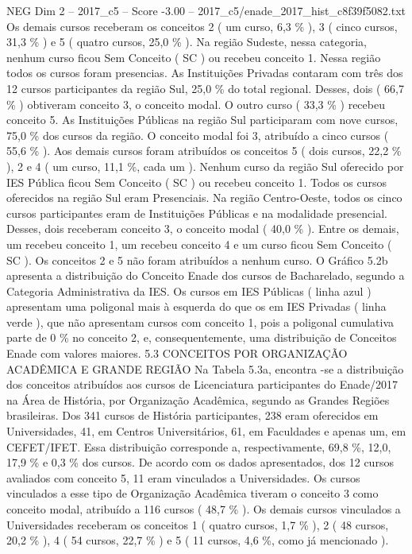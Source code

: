 \begin{textsample}{NEG Dim 2 – 2017\_c5 – Score -3.00 – 2017\_c5/enade\_2017\_hist\_c8f39f5082.txt}
Os demais cursos receberam os conceitos 2 ( um curso, 6,3 \% ), 3 ( cinco cursos, 31,3 \% ) e 5 ( quatro cursos, 25,0 \% ).
Na região Sudeste, nessa categoria, nenhum curso ficou Sem Conceito ( SC ) ou recebeu conceito 1.
Nessa região todos os cursos foram presencias.
As Instituições Privadas contaram com três dos 12 cursos participantes da região Sul, 25,0 \% do total regional.
Desses, dois ( 66,7 \% ) obtiveram conceito 3, o conceito modal.
O outro curso ( 33,3 \% ) recebeu conceito 5.
As Instituições Públicas na região Sul participaram com nove cursos, 75,0 \% dos cursos da região.
O conceito modal foi 3, atribuído a cinco cursos ( 55,6 \% ).
Aos demais cursos foram atribuídos os conceitos 5 ( dois cursos, 22,2 \% ), 2 e 4 ( um curso, 11,1 \%, cada um ).
Nenhum curso da região Sul oferecido por IES Pública ficou Sem Conceito ( SC ) ou recebeu conceito 1.
Todos os cursos oferecidos na região Sul eram Presenciais.
Na região Centro-Oeste, todos os cinco cursos participantes eram de Instituições Públicas e na modalidade presencial.
Desses, dois receberam conceito 3, o conceito modal ( 40,0 \% ).
Entre os demais, um recebeu conceito 1, um recebeu conceito 4 e um curso ficou Sem Conceito ( SC ).
Os conceitos 2 e 5 não foram atribuídos a nenhum curso.
O Gráfico 5.2b apresenta a distribuição do Conceito Enade dos cursos de Bacharelado, segundo a Categoria Administrativa da IES.
Os cursos em IES Públicas ( linha azul ) apresentam uma poligonal mais à esquerda do que os em IES Privadas ( linha verde ), que não apresentam cursos com conceito 1, pois a poligonal cumulativa parte de 0 \% no conceito 2, e, consequentemente, uma distribuição de Conceitos Enade com valores maiores. 5.3 CONCEITOS POR ORGANIZAÇÃO ACADÊMICA E GRANDE REGIÃO Na Tabela 5.3a, encontra -se a distribuição dos conceitos atribuídos aos cursos de Licenciatura participantes do Enade/2017 na Área de História, por Organização Acadêmica, segundo as Grandes Regiões brasileiras.
Dos 341 cursos de História participantes, 238 eram oferecidos em Universidades, 41, em Centros Universitários, 61, em Faculdades e apenas um, em CEFET/IFET.
Essa distribuição corresponde a, respectivamente, 69,8 \%, 12,0, 17,9 \% e 0,3 \% dos cursos.
De acordo com os dados apresentados, dos 12 cursos avaliados com conceito 5, 11 eram vinculados a Universidades.
Os cursos vinculados a esse tipo de Organização Acadêmica tiveram o conceito 3 como conceito modal, atribuído a 116 cursos ( 48,7 \% ).
Os demais cursos vinculados a Universidades receberam os conceitos 1 ( quatro cursos, 1,7 \% ), 2 ( 48 cursos, 20,2 \% ), 4 ( 54 cursos, 22,7 \% ) e 5 ( 11 cursos, 4,6 \%, como já mencionado ).

\end{textsample}
